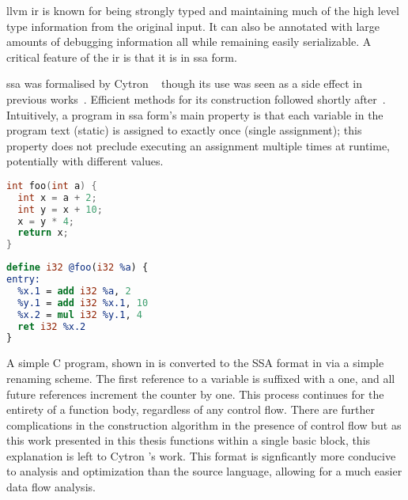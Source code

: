 \documentclass[\main/thesis.tex]{subfiles}
\begin{document}
\Gls{llvm} \gls{ir} is known for being strongly typed and maintaining much of the high level type information from the original input.
It can also be annotated with large amounts of debugging information all while remaining easily serializable.
A critical feature of the \gls{ir} is that it is in \gls{ssa} form.

\Gls{ssa} was formalised by Cytron \etal~\autocite{cytron1989efficient} though its use was seen as a side effect in previous works~\autocite{rosen1988global,alpern1988detecting}.
Efficient methods for its construction followed shortly after~\autocite{cytron1991efficiently,brandis1994single}.
Intuitively, a program in \gls{ssa} form's main property is that each variable in the program text (static) is assigned to exactly once (single assignment); this property does not preclude executing an assignment multiple times at runtime, potentially with different values.

\noindent
\begin{minipage}[t]{0.45\linewidth}
\centering
\begin{lstlisting}[caption={[Example C program, pre-SSA conversion.]An simple example C program, pre-conversion to \gls{ssa}.},
      label=lst:cSSA,numbers=none,language=c]
int foo(int a) {
  int x = a + 2;
  int y = x + 10;
  x = y * 4;
  return x;
}
\end{lstlisting}
\end{minipage}
\hspace{.05\linewidth}
\begin{minipage}[t]{0.45\linewidth}
\centering
\begin{lstlisting}[caption={[Example LLVM IR program, post-SSA conversion.]The same simple program, converted to \gls{llvm} \gls{ir} in \gls{ssa} format.},
      label=lst:llSSA,numbers=none,language=llvm]
define i32 @foo(i32 %a) {
entry:
  %x.1 = add i32 %a, 2
  %y.1 = add i32 %x.1, 10
  %x.2 = mul i32 %y.1, 4
  ret i32 %x.2
}
\end{lstlisting}
\end{minipage}

A simple C program, shown in  is converted to the SSA format in  via a simple renaming scheme.
The first reference to a variable is suffixed with a one, and all future references increment the counter by one.
This process continues for the entirety of a function body, regardless of any control flow.
There are further complications in the construction algorithm in the presence of control flow but as this work presented in this thesis functions within a single \gls{basic block}, this explanation is left to Cytron \etal's work.
This format is signficantly more conducive to analysis and optimization than the source language, allowing for a much easier data flow analysis.
\end{document}
